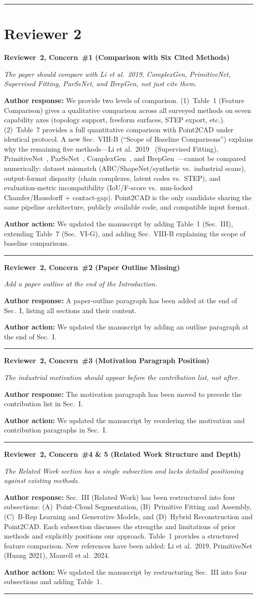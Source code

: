 \documentclass[11pt]{article}
\newcommand{\concern}[2]{\noindent\textbf{Reviewer~#1, Concern~\##2}\par}
\newcommand{\concerntext}[1]{\noindent\textit{#1}\par\medskip}
\newcommand{\authorresponse}[1]{\noindent\textbf{Author response:} #1\par\medskip}
\newcommand{\authoraction}[1]{\noindent\textbf{Author action:} We updated the manuscript by #1\par\bigskip\noindent\rule{\linewidth}{0.4pt}\par\medskip}
\begin{document}
\bigskip\noindent\rule{\linewidth}{0.8pt}\bigskip

\section*{Reviewer 2}

\concern{2}{1 (Comparison with Six Cited Methods)}
\concerntext{The paper should compare with Li et al.\ 2019,
ComplexGen, PrimitiveNet, Supervised Fitting, ParSeNet,
and BrepGen, not just cite them.}
\authorresponse{We provide two levels of comparison.
(1)~Table~1 (Feature Comparison) gives a qualitative
comparison across all surveyed methods on seven capability
axes (topology support, freeform surfaces, STEP export, etc.).
(2)~Table~7 provides a full quantitative comparison with
Point2CAD under identical protocol.
A new Sec.~VIII-B (``Scope of Baseline Comparisons'')
explains why the remaining five methods---Li et al.\ 2019~\cite{b27}
(Supervised Fitting), PrimitiveNet~\cite{b28}, ParSeNet~\cite{b19},
ComplexGen~\cite{b1}, and BrepGen~\cite{b4}---cannot be
compared numerically: dataset mismatch (ABC/ShapeNet/synthetic
vs.\ industrial scans), output-format disparity (chain complexes,
latent codes vs.\ STEP), and evaluation-metric incompatibility
(IoU/F-score vs.\ mm-locked Chamfer/Hausdorff + contact-gap).
Point2CAD is the only candidate sharing the same pipeline
architecture, publicly available code, and compatible input format.}
\authoraction{adding Table~1 (Sec.~III), extending Table~7 (Sec.~VI-G),
and adding Sec.~VIII-B explaining the scope of baseline comparisons.}

\concern{2}{2 (Paper Outline Missing)}
\concerntext{Add a paper outline at the end of the Introduction.}
\authorresponse{A paper-outline paragraph has been added at the end of Sec.~I,
listing all sections and their content.}
\authoraction{adding an outline paragraph at the end of Sec.~I.}

\concern{2}{3 (Motivation Paragraph Position)}
\concerntext{The industrial motivation should appear before the contribution
list, not after.}
\authorresponse{The motivation paragraph has been moved to precede the
contribution list in Sec.~I.}
\authoraction{reordering the motivation and contribution paragraphs in Sec.~I.}

\concern{2}{4 \& 5 (Related Work Structure and Depth)}
\concerntext{The Related Work section has a single subsection and lacks
detailed positioning against existing methods.}
\authorresponse{Sec.~III (Related Work) has been restructured into four
subsections: (A)~Point-Cloud Segmentation,
(B)~Primitive Fitting and Assembly, (C)~B-Rep Learning and
Generative Models, and (D)~Hybrid Reconstruction and Point2CAD.
Each subsection discusses the strengths and limitations of prior
methods and explicitly positions our approach.
Table~1 provides a structured feature comparison.
New references have been added: Li et al.\ 2019, PrimitiveNet
(Huang 2021), Maurell et al.\ 2024.}
\authoraction{restructuring Sec.~III into four subsections and adding Table~1.}
\end{document}
